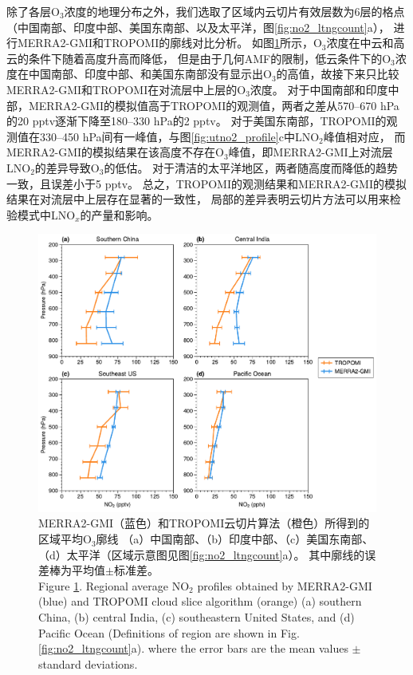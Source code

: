 除了各层O$_3$浓度的地理分布之外，我们选取了区域内云切片有效层数为6层的格点（中国南部、印度中部、美国东南部、以及太平洋，图\ref{fig:no2_ltngcount}a），
进行MERRA2-GMI和TROPOMI的廓线对比分析。
如图\ref{fig:uto3_profile}所示，O$_3$浓度在中云和高云的条件下随着高度升高而降低，
但是由于几何AMF的限制，低云条件下的O$_3$浓度在中国南部、印度中部、和美国东南部没有显示出O$_3$的高值，故接下来只比较MERRA2-GMI和TROPOMI在对流层中上层的O$_3$浓度。
对于中国南部和印度中部，MERRA2-GMI的模拟值高于TROPOMI的观测值，两者之差从570--670 hPa的20 pptv逐渐下降至180--330 hPa的2 pptv。
对于美国东南部，TROPOMI的观测值在330--450 hPa间有一峰值，与图\ref{fig:utno2_profile}c中LNO$_2$峰值相对应，
而MERRA2-GMI的模拟结果在该高度不存在O$_3$峰值，即MERRA2-GMI上对流层LNO$_2$的差异导致O$_3$的低估。
对于清洁的太平洋地区，两者随高度而降低的趋势一致，且误差小于5 pptv。
总之，TROPOMI的观测结果和MERRA2-GMI的模拟结果在对流层中上层存在显著的一致性，
局部的差异表明云切片方法可以用来检验模式中LNO$_x$的产量和影响。



\begin{figure}[!htbp]
    \centering
    \includegraphics[width=12cm]{./figures/uto3_profile.pdf}
    \caption{
    MERRA2-GMI（蓝色）和TROPOMI云切片算法（橙色）所得到的区域平均O$_3$廓线
    （a）中国南部、（b）印度中部、（c）美国东南部、（d）太平洋（区域示意图见图\ref{fig:no2_ltngcount}a）。
    其中廓线的误差棒为平均值$\pm$标准差。\\
    Figure \ref{fig:uto3_profile}. Regional average NO$_2$ profiles obtained by MERRA2-GMI (blue) and TROPOMI cloud slice algorithm (orange)
    (a) southern China, (b) central India, (c) southeastern United States, and (d) Pacific Ocean
    (Definitions of region are shown in Fig. \ref{fig:no2_ltngcount}a).
    where the error bars are the mean values $\pm$ standard deviations.
    }
    \label{fig:uto3_profile}
\end{figure}


